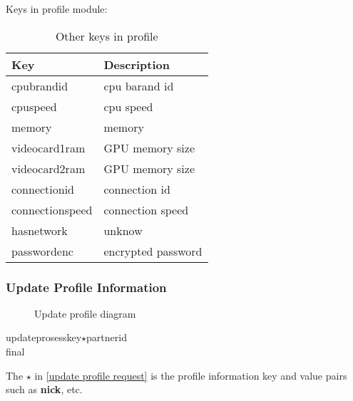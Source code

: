 \documentclass[oneside,titlepage,a4paper]{Definition/retrospy} %
\begin{document}
Keys in profile module:
\begin{table}[H]
	\centering
	\begin{tabular}{|l|l|}
		\hline 
		\textbf{Key}&\textbf{Description} \\ 
		\hline 
		cpubrandid&            cpu barand id\\\hline
		cpuspeed& cpu speed\\\hline
		memory&memory\\\hline
		videocard1ram& GPU memory size\\\hline
		videocard2ram& GPU memory size\\\hline
		connectionid&connection id\\\hline
		connectionspeed&connection speed\\\hline
		hasnetwork& unknow\\\hline
		passwordenc& encrypted password\\\hline
	\end{tabular} 
	\caption{Other keys in profile}
	\label{Other keys in profile}
\end{table}

\subsubsection{Update Profile Information}
\begin{figure}[H]
	\centering
	\caption{Update profile diagram}
	\label{Update profile diagram}
\end{figure}
\ClientRequest

\begin{mybox}[label = update profile request]
	\tbs updatepro\tbs\tbs sesskey\tbs<session key>\tbs $\star$\tbs partnerid\tbs<partner id>\\\tbs final\tbs
\end{mybox}
The $\star$ in \ref{update profile request} is the profile information key and value pairs such as\textbf{ \tbs nick\tbs}, etc.
\end{document}
